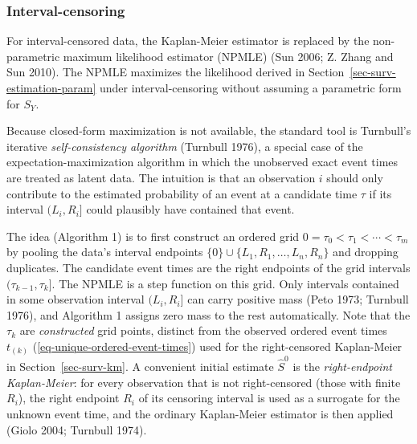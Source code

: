 \documentclass[
  letterpaper,
  krantz2]{style/krantz}
\begin{document}
\subsubsection{Interval-censoring}\label{interval-censoring}

For interval-censored data, the
Kaplan-Meier estimator is replaced by the
non-parametric maximum likelihood estimator
(NPMLE) (Sun 2006; Z.
Zhang and Sun 2010). The NPMLE maximizes the likelihood derived in
Section~\ref{sec-surv-estimation-param} under interval-censoring without
assuming a parametric form for \(S_Y\).

Because closed-form maximization is not available, the standard tool is
Turnbull's iterative \emph{self-consistency
algorithm} (Turnbull 1976), a special case of the
expectation-maximization algorithm in which the unobserved exact event
times are treated as latent data. The intuition is that an observation
\(i\) should only contribute to the estimated probability of an event at
a candidate time \(\tau\) if its interval \((L_i, R_i]\) could plausibly
have contained that event.

The idea (Algorithm 1) is to first construct an ordered grid
\(0 = \tau_0 < \tau_1 < \cdots < \tau_m\) by pooling the data's interval
endpoints \(\{0\} \cup \{L_1, R_1, \ldots, L_n, R_n\}\) and dropping
duplicates. The candidate event times are the right endpoints of the
grid intervals \((\tau_{k-1}, \tau_k]\). The NPMLE is a step function on
this grid. Only intervals contained in some observation interval
\((L_i, R_i]\) can carry positive mass (Peto 1973; Turnbull 1976), and
Algorithm 1 assigns zero mass to the rest automatically. Note that the
\(\tau_k\) are \emph{constructed} grid points, distinct from the
observed ordered event times \(t_{(k)}\)
(\ref{eq-unique-ordered-event-times}) used for the right-censored
Kaplan-Meier in Section~\ref{sec-surv-km}. A convenient initial estimate
\(\hat{S}^{0}\) is the \emph{right-endpoint Kaplan-Meier}: for every
observation that is not right-censored (those with finite \(R_i\)), the
right endpoint \(R_i\) of its censoring interval is used as a surrogate
for the unknown event time, and the ordinary Kaplan-Meier estimator is
then applied (Giolo 2004; Turnbull 1974).
\end{document}
